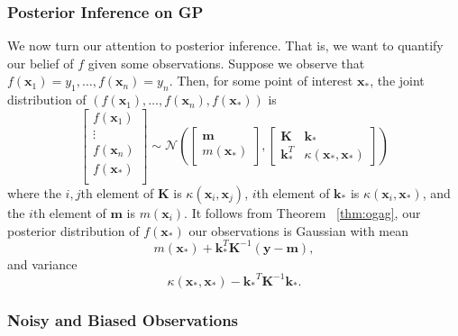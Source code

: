 \subsubsection{Posterior Inference on GP}

We now turn our attention to posterior inference.
That is, we want to quantify our belief of $f$ given some observations.
Suppose we observe that $f(\mathbf{x}_1) = y_1, \ldots, f(\mathbf{x}_n) = y_n$.
Then, for some point of interest $\mathbf{x}_*$, the joint distribution of
$(f(\mathbf{x}_1), \ldots, f(\mathbf{x}_n), f(\mathbf{x}_*))$ is
\begin{equation*}
    \begin{bmatrix}
        f(\mathbf{x}_1) \\
        \vdots \\
        f(\mathbf{x}_n) \\
        f(\mathbf{x}_*) \\
    \end{bmatrix} \sim
    \mathcal{N}\left(
    \begin{bmatrix}
        \mathbf{m} \\ m(\mathbf{x}_*)
    \end{bmatrix},
    \begin{bmatrix}
        \mathbf{K} & \mathbf{k}_* \\
        \mathbf{k}_*^T & \kappa(\mathbf{x}_*, \mathbf{x}_*)
    \end{bmatrix}\right)
\end{equation*}
where the $i,j$th element of $\mathbf{K}$ is $\kappa(\mathbf{x}_i, \mathbf{x}_j)$, 
$i$th element of $\mathbf{k}_*$ is $\kappa(\mathbf{x}_i, \mathbf{x}_*)$, and the $i$th element of $\mathbf{m}$ is $m(\mathbf{x}_i)$.
It follows from Theorem ~\ref{thm:ogag}, our posterior distribution
of $f(\mathbf{x}_*)$ our observations is Gaussian with mean
\begin{equation} \label{eq:noisless-post-mean}
    m(\mathbf{x_*}) + \mathbf{k}_*^T \mathbf{K}^{-1} (\mathbf{y} - \mathbf{m}), 
\end{equation}
and variance
\begin{equation} \label{eq:noiseless-post-var}
    \kappa(\mathbf{x}_*, \mathbf{x}_*) - \mathbf{k_*}^{T} \mathbf{K}^{-1} \mathbf{k}_*.
\end{equation}


\subsubsection{Noisy and Biased Observations}

